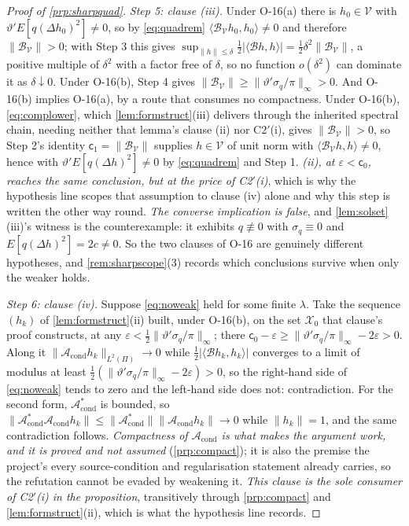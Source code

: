 \begin{proof}[Proof of \cref{prp:sharpquad}]
\emph{Step 5: clause \textup{(iii)}.} Under O-16(a) there is $h_0\in\mathcal V$ with
$\vartheta'E[q(\Delta h_0)^{2}]\ne0$, so by \eqref{eq:quadrem}
$\langle\mathcal B_{\mathcal V}h_0,h_0\rangle\ne0$ and therefore $\|\mathcal B_{\mathcal V}\|>0$; with
Step 3 this gives $\sup_{\|h\|\le\delta}\tfrac12|\langle\mathcal Bh,h\rangle|
=\tfrac12\delta^{2}\|\mathcal B_{\mathcal V}\|$, a positive multiple of $\delta^{2}$ with a factor free of
$\delta$, so no function $o(\delta^{2})$ can dominate it as $\delta\downarrow0$. Under O-16(b), Step 4
gives $\|\mathcal B_{\mathcal V}\|\ge\|\vartheta'\sigma_q/\pi\|_\infty>0$. And O-16(b) implies
O-16(a), by a route that consumes no compactness. Under O-16(b), \eqref{eq:complower}, 
which \cref{lem:formstruct}(iii) delivers through the inherited spectral chain, needing neither that
lemma's clause \textup{(ii)} nor C2$'$(i), gives $\|\mathcal B_{\mathcal V}\|>0$, so Step 2's identity
$\mathsf c_1=\|\mathcal B_{\mathcal V}\|$ supplies $h\in\mathcal V$ of unit norm with
$\langle\mathcal B_{\mathcal V}h,h\rangle\ne0$, hence with $\vartheta'E[q(\Delta h)^{2}]\ne0$ by
\eqref{eq:quadrem} and Step 1. \emph{\textup{(ii)}, at $\varepsilon<\mathsf c_0$,
reaches the same conclusion, but at the price of C2$'$\textup{(i)}}, which is why the hypothesis line
scopes that assumption to clause \textup{(iv)} alone and why this step is written the other way round.
\emph{The converse implication is false}, and \cref{lem:solset}(iii)'s witness is the counterexample: it
exhibits $q\not\equiv0$ with $\sigma_q\equiv0$ and $E[q(\Delta h)^{2}]=2c\ne0$. So the two clauses of
O-16 are genuinely different hypotheses, and \cref{rem:sharpscope}\textup{(3)} records which conclusions
survive when only the weaker holds.

\emph{Step 6: clause \textup{(iv)}.} Suppose \eqref{eq:noweak} held for some finite $\lambda$. Take the
sequence $(h_k)$ of \cref{lem:formstruct}(ii) built, under O-16(b), on the set $\mathcal X_0$ that
clause's proof constructs, at any $\varepsilon<\tfrac12\|\vartheta'\sigma_q/\pi\|_\infty$; there
$\mathsf c_0-\varepsilon\ge\|\vartheta'\sigma_q/\pi\|_\infty-2\varepsilon>0$. Along it
$\|\mathcal A_{\mathrm{cond}}h_k\|_{L^{2}(\Pi)}\to0$ while
$\tfrac12|\langle\mathcal Bh_k,h_k\rangle|$ converges to a limit of modulus at least
$\tfrac12(\|\vartheta'\sigma_q/\pi\|_\infty-2\varepsilon)>0$,
so the right-hand side of \eqref{eq:noweak} tends to zero and the left-hand side does not:
contradiction. For the second form, $\mathcal A^\ast_{\mathrm{cond}}$ is bounded, so
$\|\mathcal A^\ast_{\mathrm{cond}}\mathcal A_{\mathrm{cond}}h_k\|\le\|\mathcal A^\ast_{\mathrm{cond}}\|\|\mathcal A_{\mathrm{cond}}h_k\|\to0$
while $\|h_k\|=1$, and the same contradiction follows. \emph{Compactness of
$\mathcal A_{\mathrm{cond}}$ is what makes the argument work, and it is proved and not assumed}
(\cref{prp:compact}); it is also the premise the project's every source-condition and regularisation
statement already carries, so the refutation cannot be evaded by weakening it. \emph{This clause is the
sole consumer of C2$'$(i) in the proposition}, transitively through \cref{prp:compact} and
\cref{lem:formstruct}(ii), which is what the hypothesis line records.
\end{proof}

